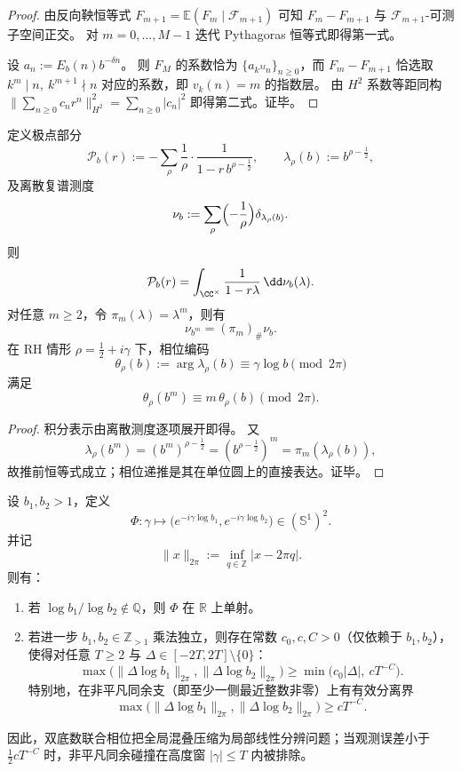 \begin{proof}
由反向鞅恒等式
\(
F_{m+1}=\mathbb E(F_m\mid\mathcal F_{m+1})
\)
可知 \(F_m-F_{m+1}\) 与 \(\mathcal F_{m+1}\)-可测子空间正交。
对 \(m=0,\dots,M-1\) 迭代 Pythagoras 恒等式即得第一式。

设 \(a_n:=E_b(n)b^{-\delta n}\)。
则 \(F_M\) 的系数恰为 \(\{a_{k^Mn}\}_{n\ge 0}\)，而 \(F_m-F_{m+1}\) 恰选取
\(
k^m\mid n,\ k^{m+1}\nmid n
\)
对应的系数，即 \(v_k(n)=m\) 的指数层。
由 \(H^2\) 系数等距同构
\(
\| \sum_{n\ge 0}c_n r^n\|_{H^2}^2=\sum_{n\ge 0}|c_n|^2
\)
即得第二式。证毕。
\end{proof}

\begin{proposition}[极点谱测度在幂映射下的推前兼容]\label{prop:abel-weil-polar-measure-power-pushforward}
定义极点部分
\[
\mathcal P_b(r):=-\sum_{\rho}\frac1{\rho}\cdot\frac1{1-r\,b^{\rho-\frac12}},
\qquad
\lambda_\rho(b):=b^{\rho-\frac12},
\]
及离散复谱测度
\[
\nu_b:=\sum_{\rho}\Bigl(-\frac1{\rho}\Bigr)\delta_{\lambda_\rho(b)}.
\]
则
\[
\mathcal P_b(r)=\int_{\CC^\times}\frac{1}{1-r\lambda}\,\dd\nu_b(\lambda).
\]
对任意 \(m\ge 2\)，令 \(\pi_m(\lambda)=\lambda^m\)，则有
\[
\nu_{b^m}=(\pi_m)_\#\nu_b.
\]
在 RH 情形 \(\rho=\frac12+i\gamma\) 下，相位编码
\[
\theta_\rho(b):=\arg\lambda_\rho(b)\equiv\gamma\log b\pmod{2\pi}
\]
满足
\[
\theta_\rho(b^m)\equiv m\,\theta_\rho(b)\pmod{2\pi}.
\]
\end{proposition}

\begin{proof}
积分表示由离散测度逐项展开即得。
又
\[
\lambda_\rho(b^m)=(b^m)^{\rho-\frac12}
=(b^{\rho-\frac12})^m
=\pi_m(\lambda_\rho(b)),
\]
故推前恒等式成立；相位递推是其在单位圆上的直接表达。证毕。
\end{proof}

\begin{theorem}\label{thm:abel-dual-base-dealiasing-baker-effective-separation}
设 \(b_1,b_2>1\)，定义
\[
\Phi:\gamma\longmapsto\bigl(e^{-i\gamma\log b_1},e^{-i\gamma\log b_2}\bigr)\in(\mathbb S^1)^2.
\]
并记
\[
\|x\|_{2\pi}:=\inf_{q\in\mathbb Z}|x-2\pi q|.
\]
则有：
\begin{enumerate}
  \item 若 \(\log b_1/\log b_2\notin\mathbb Q\)，则 \(\Phi\) 在 \(\mathbb R\) 上单射。
  \item 若进一步 \(b_1,b_2\in\mathbb Z_{>1}\) 乘法独立，则存在常数 \(c_0,c,C>0\)（仅依赖于 \(b_1,b_2\)），使得对任意 \(T\ge 2\) 与 \(\Delta\in[-2T,2T]\setminus\{0\}\)：
  \[
  \max\!\bigl(\|\Delta\log b_1\|_{2\pi},\|\Delta\log b_2\|_{2\pi}\bigr)
  \ge
  \min\!\bigl(c_0|\Delta|,\ cT^{-C}\bigr).
  \]
  特别地，在非平凡同余支（即至少一侧最近整数非零）上有有效分离界
  \[
  \max\!\bigl(\|\Delta\log b_1\|_{2\pi},\|\Delta\log b_2\|_{2\pi}\bigr)\ge cT^{-C}.
  \]
\end{enumerate}
因此，双底数联合相位把全局混叠压缩为局部线性分辨问题；当观测误差小于 \(\tfrac12 cT^{-C}\) 时，非平凡同余碰撞在高度窗 \(|\gamma|\le T\) 内被排除。
\end{theorem}

